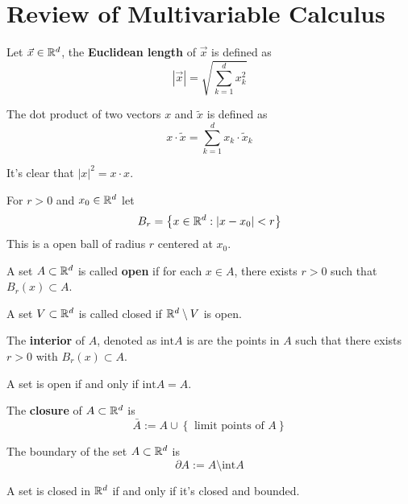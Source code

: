 \section*{Review of Multivariable Calculus}
\begin{definition}
	Let $\vec x \in \mathbb R^d$, the \textbf{Euclidean length} of $\vec x$ is defined as
	\[ |\vec x| = \sqrt{\sum_{k=1}^{d} x_k^2}\]
\end{definition}
\begin{definition}
	The dot product of two vectors $x$ and $\tilde x$ is defined as
	\[ x \cdot \tilde x = \sum_{k=1}^{d} x_k \cdot \tilde x_k\]
\end{definition}
\begin{remark}
	It's clear that $|x|^2 = x \cdot x$.
\end{remark}
\begin{definition}
	For $r > 0$ and $x_0 \in \mathbb R^d$ let
	\[ B_r = \left\{ x \in \mathbb R^d : |x - x_0| < r \right\}\]
	This is a open ball of radius $r$ centered at $x_0$.
\end{definition}
\begin{definition}
	A set $A \subset \mathbb R^d$ is called \textbf{open} if for each $x \in A$, there exists $r > 0$ such that $B_r(x) \subset A$. 
\end{definition}
\begin{definition}
	A set $V \subset \mathbb R^d$ is called closed if $\mathbb R^d \setminus V$ is open. 
\end{definition}
\begin{definition}
	The \textbf{interior} of $A$, denoted as $\mathrm{int} A$ is are the points in $A$ such that there exists $r > 0$ with $B_r(x) \subset A$.
\end{definition}
\begin{theorem}
	A set is open if and only if $\mathrm{int} A = A$.
\end{theorem}
\begin{definition}
	The \textbf{closure} of $A \subset \mathbb R^d$ is
	\[ \bar A := A \cup \left\{ \text{ limit points of $A$} \right\}\]
\end{definition}
\begin{definition}
	The boundary of the set $A \subset \mathbb R^d$ is
	\[ \partial A := A \setminus \mathrm{int} A\]
\end{definition}
\begin{theorem}
	A set is closed in $\mathbb R^d$ if and only if it's closed and bounded.
\end{theorem}
